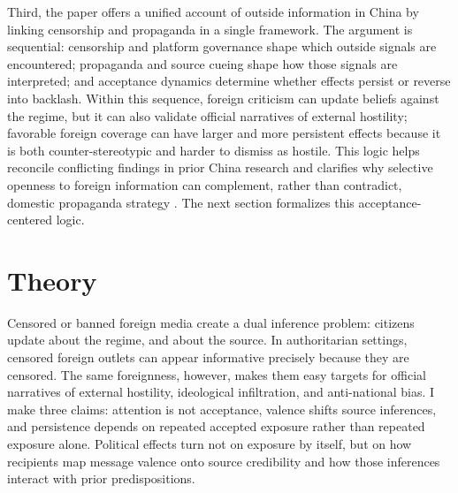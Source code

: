 \documentclass[12pt,american]{article}
\begin{document}
Third, the paper offers a unified account of outside information in China by linking censorship and propaganda in a single framework. The argument is sequential: censorship and platform governance shape which outside signals are encountered; propaganda and source cueing shape how those signals are interpreted; and acceptance dynamics determine whether effects persist or reverse into backlash. Within this sequence, foreign criticism can update beliefs against the regime, but it can also validate official narratives of external hostility; favorable foreign coverage can have larger and more persistent effects because it is both counter-stereotypic and harder to dismiss as hostile. This logic helps reconcile conflicting findings in prior China research and clarifies why selective openness to foreign information can complement, rather than contradict, domestic propaganda strategy \citep{chenyang2019,huang2015international,huangyeh2017,wangwestwood2024,QinStrombergWu2017,KingPanRoberts2017,GueorguievMalesky2019,huang2015signal,Huang2018}. The next section formalizes this acceptance-centered logic.
	
	
	\section*{Theory}
	
Censored or banned foreign media create a dual inference problem: citizens update about the regime, and about the source. In authoritarian settings, censored foreign outlets can appear informative precisely because they are censored. The same foreignness, however, makes them easy targets for official narratives of external hostility, ideological infiltration, and anti-national bias. I make three claims: attention is not acceptance, valence shifts source inferences, and persistence depends on repeated accepted exposure rather than repeated exposure alone. Political effects turn not on exposure by itself, but on how recipients map message valence onto source credibility and how those inferences interact with prior predispositions.
\end{document}
